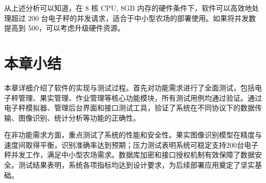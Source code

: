 从上述分析可以知道，在 8 核 CPU, 8GB 内存的硬件条件下，软件可以高效地处理超过 200 台电子秤的并发请求，适合于中小型农场的部署使用。如果将并发数提高到 500，可以考虑升级硬件资源。

\section{本章小结}

本章详细介绍了软件的实现与测试过程。首先对功能需求进行了全面测试，包括电子秤管理、果实管理、作业管理等核心功能模块，所有测试用例均通过验证。通过电子秤模拟器、管理后台界面和接口测试工具，验证了系统在不同协议下的数据传输、图像识别、统计分析等功能的正确性。

在非功能需求方面，重点测试了系统的性能和安全性。果实图像识别模型在精度与速度间取得平衡，识别准确率达到预期；压力测试表明系统可稳定支持200台电子秤并发工作，满足中小型农场需求。数据库加密和接口授权机制有效保障了数据安全。测试结果表明，系统各项指标均达到设计要求，为后续部署应用奠定了坚实基础。
